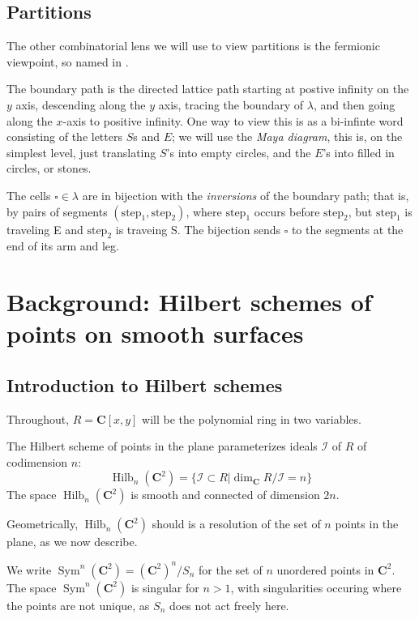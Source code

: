 \documentclass{amsart}[12pt]
\theoremstyle{definition}
\newcommand{\C}{\mathbf{C}}
\newcommand{\II}{\mathcal{I}}
\DeclareMathOperator{\Hilb}{Hilb}
\DeclareMathOperator{\Sym}{Sym}
\begin{document}
\subsection{Partitions}


The other combinatorial lens we will use to view partitions is the fermionic viewpoint, so named in .  

The boundary path is the directed lattice path starting at postive infinity on the $y$ axis, descending along the $y$ axis, tracing the boundary of $\lambda$, and then going along the $x$-axis to positive infinity.  One way to view this is as a bi-infinte word consisting of the letters $S$s and $E$; we will use the \emph{Maya diagram}, this is, on the simplest level, just translating $S$'s into empty circles, and the $E$'s into filled in circles, or stones.  



The cells $\square\in\lambda$ are in bijection with the
\emph{inversions} of the boundary path; that is, by pairs of segments
$(\text{step}_1, \text{step}_2)$, where $\text{step}_1$ occurs before $\text{step}_2$, but $\text{step}_1$ is traveling E and $\text{step}_2$ is traveing S.  The bijection sends $\square$ to the segments at the end of its arm and leg.





\section{Background: Hilbert schemes of points on smooth surfaces}
\label{sec:smoothbackground}



\subsection{Introduction to Hilbert schemes}

Throughout, $R=\C[x,y]$ will be the polynomial ring in two variables.  

The Hilbert scheme of points in the plane parameterizes ideals $\II$ of $R$ of codimension $n$:
$$\Hilb_n(\C^2)=\{\II\subset R | \dim_\C R/\II=n\}$$
The space $\Hilb_n(\C^2)$ is smooth and connected of dimension $2n$.

Geometrically, $\Hilb_n(\C^2)$ should is a resolution of the set of $n$ points in the plane, as we now describe.

 We write $\Sym^n(\C^2)=(\C^2)^n/S_n$ for the set of $n$ unordered points in $\C^2$.  The space $\Sym^n(\C^2)$ is singular for $n>1$, with singularities occuring where the points are not unique, as $S_n$ does not act freely here.  
\end{document}
